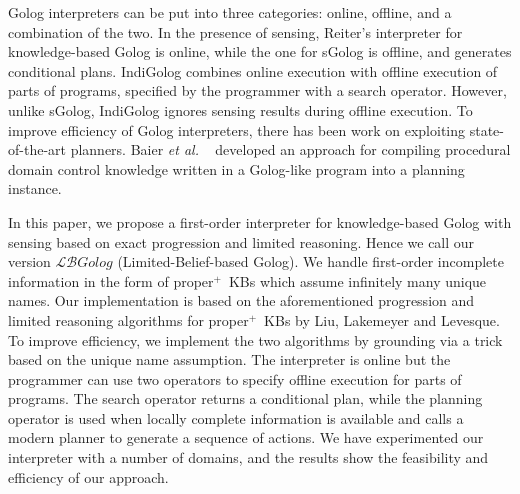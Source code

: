 \documentclass[letterpaper]{article}
\newcommand\etc{{\it et al. }}
\newcommand{\LBGolog}{\mathcal{LB}Golog}
\newcommand{\properplus}{\mbox{proper$^+$}}
\begin{document}
Golog interpreters can be put into three categories: online, offline, and a combination of the two.
In the presence of sensing, Reiter's interpreter for knowledge-based Golog is online, while the one for sGolog \cite{Lak99} is offline, and generates conditional plans. IndiGolog combines online execution with offline execution of parts of programs, specified by the programmer with a search operator. However, unlike sGolog, IndiGolog ignores sensing results during offline execution.
To improve efficiency of Golog interpreters, there has been work on exploiting state-of-the-art planners. Baier \etc\  developed an approach for compiling procedural domain control knowledge written in a Golog-like program into a planning instance.

In this paper, we propose a first-order interpreter for knowledge-based Golog with sensing based on exact progression and limited reasoning. Hence we call our version $\LBGolog$ (Limited-Belief-based Golog). We handle first-order incomplete information in the form of \properplus\ KBs which assume infinitely many unique names. Our implementation is based on the aforementioned progression and limited reasoning algorithms for \properplus\ KBs by Liu, Lakemeyer and Levesque.
To improve efficiency, we implement the two algorithms by grounding via a trick based on the unique name assumption.
The interpreter is online but the programmer can use two operators to specify offline execution for parts of programs. The search operator returns a conditional plan, while the planning operator is used when locally complete information is available and calls a modern planner to generate a sequence of actions.
We have experimented our interpreter with a number of domains, and the results show the feasibility and efficiency of our approach.

\end{document}
